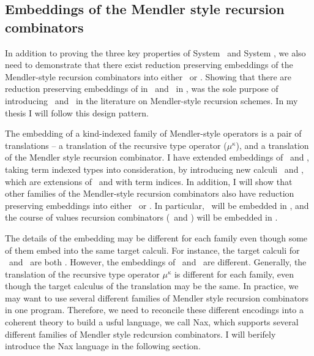 \subsection{Embeddings of the Mendler style recursion combinators} In
addition to proving the three key properties of System \Fi\ and System
\Fixi, we also need to demonstrate that there exist reduction preserving
embeddings of the Mendler-style recursion combinators into either \Fi\ or
\Fixi. Showing that there are reduction preserving embeddings of \MIt in
\Fw\ and \MPr\ in \Fixw, was the sole purpose of introducing \Fw\ and \Fixw\ in
the literature on Mendler-style recursion schemes. In my thesis
I will follow this design pattern.

The embedding of a kind-indexed family of Mendler-style operators is
a pair of translations -- a translation of the recursive type operator
($\mu^\kappa$), and a translation of the Mendler style recursion combinator. 
I have extended embeddings of \MIt\ and \MPr, taking term indexed
types into consideration, by introducing new calculi \Fi\ and \Fixw,
which are extensions of \Fw\ and \Fixi with term indices. In addition,
I will show that other families of the Mendler-style recursion combinators
also have reduction preserving embeddings into either \Fi\ or \Fixi.
In particular, \MsfIt\ will be embedded in \Fi, and the course of values
recursion combinators (\McvIt\ and \McvPr) will be embedded in \Fixi.

The details of the embedding may be different for each family even though
some of them embed into the same target calculi. For instance, the target
calculi for \MIt\ and \MsfIt\ are both \Fi. However, the embeddings
of \MIt\ and \MsfIt\ are different. Generally, the translation of
the recursive type operator $\mu^\kappa$ is different for each family,
even though the target calculus of the translation may be the same.
In practice, we may want to use several different families of Mendler style
recursion combinators in one program. Therefore, we need to reconcile
these different encodings into a coherent theory to build a usful language,
we call Nax, which supports several different families of Mendler style
redcursion combinators. I will berifely introduce the Nax language
in the following section.

